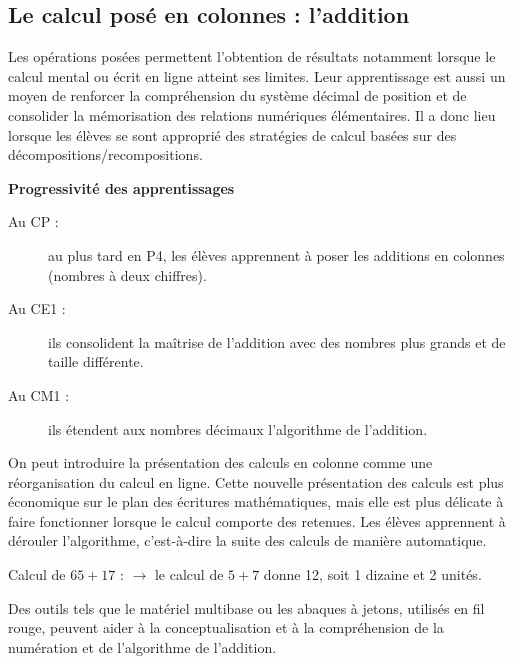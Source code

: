 \pagebreak


\subsection{Le calcul posé en colonnes : l'addition}%

Les opérations posées permettent l’obtention de résultats notamment lorsque le calcul mental ou écrit en ligne atteint ses limites. Leur apprentissage est aussi un moyen de renforcer la compréhension du système décimal de position et de consolider la mémorisation des relations numériques élémentaires. Il a donc lieu lorsque les élèves se sont approprié des stratégies de calcul basées sur des décompositions/recompositions. \medskip

{\bf Progressivité des apprentissages}
\begin{description}
   \item[Au CP :] au plus tard en P4, les élèves apprennent à poser les additions en colonnes (nombres à deux chiffres).
   \item[Au CE1 :] ils consolident la maîtrise de l’addition avec des nombres plus grands et de taille différente.
   \item[Au CM1 :] ils étendent aux nombres décimaux l'algorithme de l'addition.
\end{description}

On peut introduire la présentation des calculs en colonne comme une réorganisation du calcul en ligne. Cette nouvelle présentation des calculs est plus économique sur le plan des écritures mathématiques, mais elle est plus délicate à faire fonctionner lorsque le calcul comporte des retenues. Les élèves apprennent à dérouler l'algorithme, c'est-à-dire la suite des calculs de manière automatique.
   
\begin{exemple*1}
   Calcul de $65+17$ : \;  \; $\to$ le calcul de $5+7$ donne 12, soit 1 dizaine et 2 unités.
\end{exemple*1} \smallskip
   
   Des outils tels que le matériel multibase ou les abaques à jetons, utilisés en fil rouge, peuvent aider à la conceptualisation et à la compréhension de la numération et de l'algorithme de l'addition.
   
